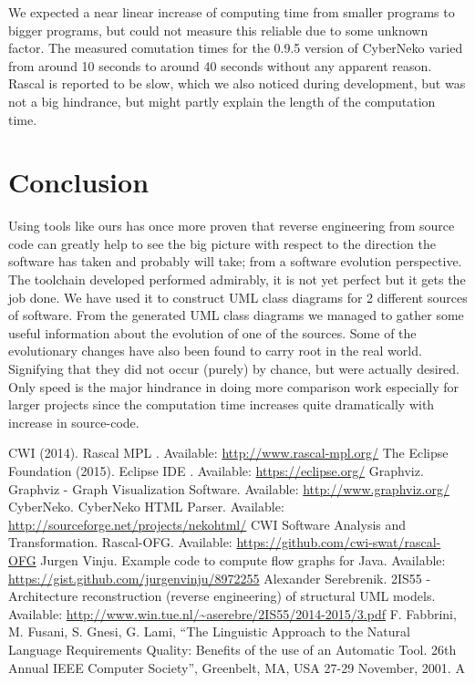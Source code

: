 \documentclass[a4paper,twoside,11pt]{article}
\begin{document}
We expected a near linear increase of computing time from smaller programs to bigger programs, but could not measure this reliable due to some unknown factor. The measured comutation times for the 0.9.5 version of CyberNeko varied from around 10 seconds to around 40 seconds without any apparent reason. Rascal is reported to be slow, which we also noticed during development, but was not a big hindrance, but might partly explain the length of the computation time.


\section{Conclusion}
\label{sec:conclusion}
Using tools like ours has once more proven that reverse engineering from source code can greatly help to see the big picture with respect to the direction the software has taken and probably will take; from a software evolution perspective. The toolchain developed performed admirably, it is not yet perfect but it gets the job done. We have used it to construct UML class diagrams for 2 different sources of software. From the generated UML class diagrams we managed to gather some useful information about the evolution of one of the sources. Some of the evolutionary changes have also been found to carry root in the real world. Signifying that they did not occur (purely) by chance, but were actually desired. Only speed is the major hindrance in doing more comparison work especially for larger projects since the computation time increases quite dramatically with increase in source-code.


\begin{thebibliography}{9}
  CWI (2014). Rascal MPL . Available: \url{http://www.rascal-mpl.org/}
  The Eclipse Foundation (2015). Eclipse IDE . Available: \url{https://eclipse.org/}
 Graphviz. Graphviz - Graph Visualization Software. Available: \url{http://www.graphviz.org/}
 CyberNeko. CyberNeko HTML Parser. Available: \url{http://sourceforge.net/projects/nekohtml/}
 CWI Software Analysis and Transformation. Rascal-OFG. Available: \url{https://github.com/cwi-swat/rascal-OFG}
 Jurgen Vinju. Example code to compute flow graphs for Java. Available: \url{https://gist.github.com/jurgenvinju/8972255}
 Alexander Serebrenik. 2IS55 - Architecture reconstruction (reverse engineering) of structural UML models. Available: \url{http://www.win.tue.nl/~aserebre/2IS55/2014-2015/3.pdf}
  F. Fabbrini, M. Fusani, S. Gnesi, G. Lami, ``The Linguistic Approach to the Natural Language Requirements Quality: Benefits of the use of an Automatic Tool. 26th Annual IEEE Computer Society'', Greenbelt, MA, USA 27-29 November, 2001. A
\end{thebibliography}
\end{document}
